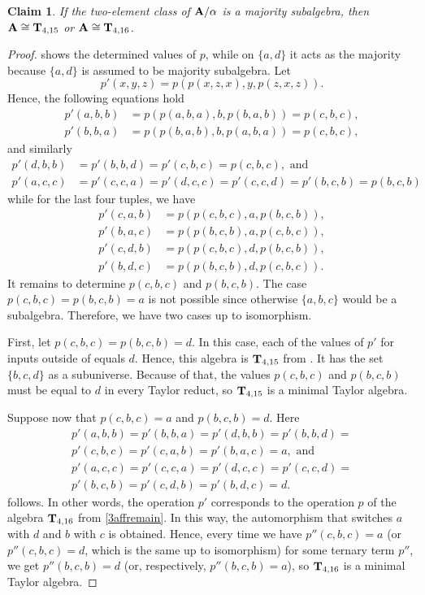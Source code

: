 \documentclass[11pt]{amsart}
\newcommand{\m}[1]{\mathbf{\uppercase{#1}}}
\theoremstyle{definition}
\theoremstyle{remark}
\theoremstyle{plain}
\newtheorem{claim}[thm]{Claim}
\begin{document}
\begin{claim}

If the two-element class of $\m a/\alpha$ is a majority subalgebra, then  $\m a\cong\m t_{4,15}$ or $\m a\cong\m t_{4,16}$.
\end{claim}
\begin{proof}
 shows the determined values of $p$, while on $\{a,d\}$ it acts as the majority because $\{a,d\}$ is assumed to be majority subalgebra. Let $$p'(x,y,z)=p(p(x,z,x),y,p(z,x,z)).$$ Hence, the following equations hold
\begin{align*}
p'(a,b,b)&=p(p(a,b,a),b,p(b,a,b))=p(c,b,c),\\
p'(b,b,a)&=p(p(b,a,b),b,p(a,b,a))=p(c,b,c),
\end{align*}
and similarly
\begin{align*}
    p'(d,b,b)&=p'(b,b,d)=p'(c,b,c)=p(c,b,c),\text{ and}\\
    p'(a,c,c)&=p'(c,c,a)=p'(d,c,c)=p'(c,c,d)=p'(b,c,b)=p(b,c,b)
\end{align*}
while for the last four tuples, we have
\begin{align*}
    p'(c,a,b)&=p(p(c,b,c),a,p(b,c,b)),\\
    p'(b,a,c)&=p(p(b,c,b),a,p(c,b,c)),\\
    p'(c,d,b)&=p(p(c,b,c),d,p(b,c,b)),\\
    p'(b,d,c)&=p(p(b,c,b),d,p(c,b,c)).
\end{align*}
It remains to determine $p(c,b,c)$ and $p(b,c,b)$. The case $p(c,b,c)=p(b,c,b)=a$ is not possible since otherwise $\{a,b,c\}$ would be a subalgebra. Therefore, we have two cases up to isomorphism.

First, let $p(c,b,c)=p(b,c,b)=d$. In this case, each of the values of $p'$ for inputs outside of  equals $d$. Hence, this algebra is $\m t_{4,15}$ from . It has the set $\{b,c,d\}$ as a subuniverse. Because of that, the values $p(c,b,c)$ and $p(b,c,b)$ must be equal to $d$ in every Taylor reduct, so $\m t_{4,15}$ is a minimal Taylor algebra. 

Suppose now that $p(c,b,c)=a$ and $p(b,c,b)=d$. Here
$$
\begin{gathered}
    p'(a,b,b)=p'(b,b,a)=p'(d,b,b)=p'(b,b,d)=\\
    p'(c,b,c)=p'(c,a,b)=p'(b,a,c)=a,\text{ and}\\
    p'(a,c,c)=p'(c,c,a)=p'(d,c,c)=p'(c,c,d)=\\
    p'(b,c,b)=p'(c,d,b)=p'(b,d,c)=d.
\end{gathered}
$$
follows. In other words, the operation $p'$ corresponds to the operation $p$ of the algebra $\m t_{4,16}$ from \ref{3affremain}. In this way, the automorphism that switches $a$ with $d$ and $b$ with $c$ is obtained. Hence, every time we have $p''(c,b,c)=a$ (or $p''(c,b,c)=d$, which is the same up to isomorphism) for some ternary term $p''$, we get $p''(b,c,b)=d$ (or, respectively, $p''(b,c,b)=a$), so $\m t_{4,16}$ is a minimal Taylor algebra.
\end{proof}
\end{document}

